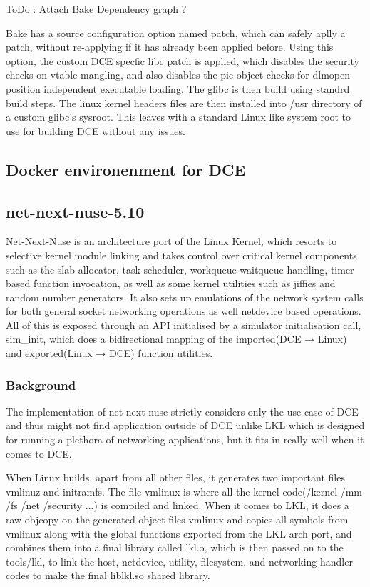 \documentclass{sig-alternate}
\begin{document}
ToDo : Attach Bake Dependency graph ? 

Bake has a source configuration option named patch, which can safely aplly a patch, without re-applying if it has already been applied before.
Using this option, the custom DCE specfic libc patch is applied, which disables the security checks on vtable mangling, and also disables the 
pie object checks for dlmopen position independent executable loading. The glibc is then build using standrd build steps. The linux kernel headers
files are then installed into /usr directory of a custom glibc's sysroot. This leaves with a standard Linux like system root to use for building 
DCE without any issues. 


\subsection{Docker environenment for DCE}

\subsection{net-next-nuse-5.10}
Net-Next-Nuse is an architecture port of the Linux Kernel, which resorts to selective kernel module linking and takes control over critical kernel 
components such as the slab allocator, task scheduler, workqueue-waitqueue handling, timer based function invocation, as well as some kernel 
utilities such as jiffies and random number generators. It also sets up emulations of the network system calls for both general socket networking 
operations as well netdevice based operations. All of this is exposed through an API initialised by a simulator initialisation call, sim\_init, 
which does a bidirectional mapping of the imported(DCE → Linux) and exported(Linux → DCE) function utilities.

\subsubsection{Background}
The implementation of net-next-nuse strictly considers only the use case of DCE and thus might not find application outside of DCE unlike LKL which
is designed for running a plethora of networking applications, but it fits in really well when it comes to DCE. 

When Linux builds, apart from all other files, it generates two important files vmlinuz and initramfs. The file vmlinux is where all the kernel 
code(/kernel /mm /fs /net /security ...) is compiled and linked. When it comes to LKL, it does a raw objcopy on the generated object 
files vmlinux and copies all symbols from vmlinux along with the global functions exported from the LKL arch port, and combines them into a final 
library called lkl.o, which is then passed on to the tools/lkl, to link the host, netdevice, utility, filesystem, and networking handler codes to 
make the final liblkl.so shared library.
\end{document}
